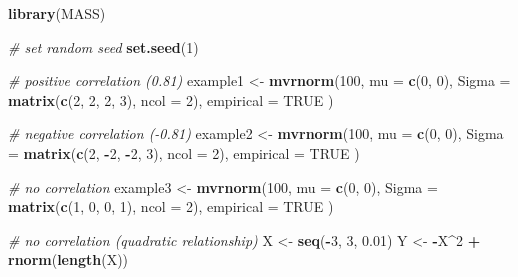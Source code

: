 \documentclass[]{book}
\newenvironment{Shaded}{\begin{snugshade}}{\end{snugshade}}
\newcommand{\KeywordTok}[1]{\textcolor[rgb]{0.13,0.29,0.53}{\textbf{#1}}}
\newcommand{\DataTypeTok}[1]{\textcolor[rgb]{0.13,0.29,0.53}{#1}}
\newcommand{\DecValTok}[1]{\textcolor[rgb]{0.00,0.00,0.81}{#1}}
\newcommand{\FloatTok}[1]{\textcolor[rgb]{0.00,0.00,0.81}{#1}}
\newcommand{\StringTok}[1]{\textcolor[rgb]{0.31,0.60,0.02}{#1}}
\newcommand{\CommentTok}[1]{\textcolor[rgb]{0.56,0.35,0.01}{\textit{#1}}}
\newcommand{\OtherTok}[1]{\textcolor[rgb]{0.56,0.35,0.01}{#1}}
\newcommand{\OperatorTok}[1]{\textcolor[rgb]{0.81,0.36,0.00}{\textbf{#1}}}
\newcommand{\NormalTok}[1]{#1}
\theoremstyle{definition}
\theoremstyle{definition}
\theoremstyle{definition}
\theoremstyle{remark}
\begin{document}
\begin{Shaded}
\begin{Highlighting}[]
\KeywordTok{library}\NormalTok{(MASS)}

\CommentTok{# set random seed}
\KeywordTok{set.seed}\NormalTok{(}\DecValTok{1}\NormalTok{)}

\CommentTok{# positive correlation (0.81)}
\NormalTok{example1 <-}\StringTok{ }\KeywordTok{mvrnorm}\NormalTok{(}\DecValTok{100}\NormalTok{,}
                    \DataTypeTok{mu =} \KeywordTok{c}\NormalTok{(}\DecValTok{0}\NormalTok{, }\DecValTok{0}\NormalTok{), }
                    \DataTypeTok{Sigma =} \KeywordTok{matrix}\NormalTok{(}\KeywordTok{c}\NormalTok{(}\DecValTok{2}\NormalTok{, }\DecValTok{2}\NormalTok{, }\DecValTok{2}\NormalTok{, }\DecValTok{3}\NormalTok{), }\DataTypeTok{ncol =} \DecValTok{2}\NormalTok{),}
                    \DataTypeTok{empirical =} \OtherTok{TRUE}
\NormalTok{                    )}

\CommentTok{# negative correlation (-0.81)}
\NormalTok{example2 <-}\StringTok{ }\KeywordTok{mvrnorm}\NormalTok{(}\DecValTok{100}\NormalTok{,}
                    \DataTypeTok{mu =} \KeywordTok{c}\NormalTok{(}\DecValTok{0}\NormalTok{, }\DecValTok{0}\NormalTok{), }
                    \DataTypeTok{Sigma =} \KeywordTok{matrix}\NormalTok{(}\KeywordTok{c}\NormalTok{(}\DecValTok{2}\NormalTok{, }\OperatorTok{-}\DecValTok{2}\NormalTok{, }\OperatorTok{-}\DecValTok{2}\NormalTok{, }\DecValTok{3}\NormalTok{), }\DataTypeTok{ncol =} \DecValTok{2}\NormalTok{),}
                    \DataTypeTok{empirical =} \OtherTok{TRUE}
\NormalTok{                    )}

\CommentTok{# no correlation }
\NormalTok{example3 <-}\StringTok{ }\KeywordTok{mvrnorm}\NormalTok{(}\DecValTok{100}\NormalTok{,}
                    \DataTypeTok{mu =} \KeywordTok{c}\NormalTok{(}\DecValTok{0}\NormalTok{, }\DecValTok{0}\NormalTok{), }
                    \DataTypeTok{Sigma =} \KeywordTok{matrix}\NormalTok{(}\KeywordTok{c}\NormalTok{(}\DecValTok{1}\NormalTok{, }\DecValTok{0}\NormalTok{, }\DecValTok{0}\NormalTok{, }\DecValTok{1}\NormalTok{), }\DataTypeTok{ncol =} \DecValTok{2}\NormalTok{),}
                    \DataTypeTok{empirical =} \OtherTok{TRUE}
\NormalTok{                    )}

\CommentTok{# no correlation (quadratic relationship)}
\NormalTok{X <-}\StringTok{ }\KeywordTok{seq}\NormalTok{(}\OperatorTok{-}\DecValTok{3}\NormalTok{, }\DecValTok{3}\NormalTok{, }\FloatTok{0.01}\NormalTok{)}
\NormalTok{Y <-}\StringTok{ }\OperatorTok{-}\NormalTok{X}\OperatorTok{^}\DecValTok{2} \OperatorTok{+}\StringTok{ }\KeywordTok{rnorm}\NormalTok{(}\KeywordTok{length}\NormalTok{(X))}


\end{Highlighting}
\end{Shaded}
\end{document}
